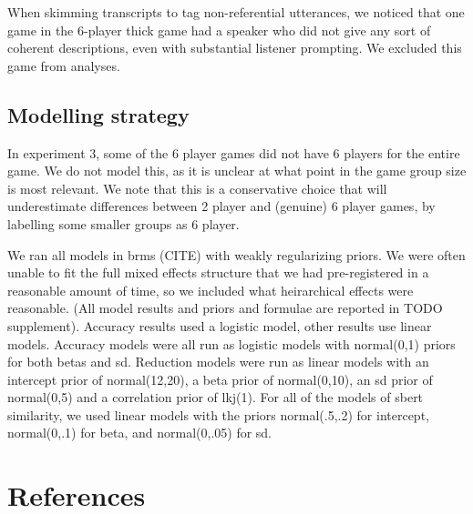 \documentclass[
  english,
  a4paper,
]{article}
\begin{document}
When skimming transcripts to tag non-referential utterances, we noticed that one game in the 6-player thick game had a speaker who did not give any sort of coherent descriptions, even with substantial listener prompting. We excluded this game from analyses.

\hypertarget{modelling-strategy}{%
\subsection{Modelling strategy}\label{modelling-strategy}}

In experiment 3, some of the 6 player games did not have 6 players for the entire game. We do not model this, as it is unclear at what point in the game group size is most relevant. We note that this is a conservative choice that will underestimate differences between 2 player and (genuine) 6 player games, by labelling some smaller groups as 6 player.

We ran all models in brms (CITE) with weakly regularizing priors. We were often unable to fit the full mixed effects structure that we had pre-registered in a reasonable amount of time, so we included what heirarchical effects were reasonable. (All model results and priors and formulae are reported in TODO supplement). Accuracy results used a logistic model, other results use linear models. Accuracy models were all run as logistic models with normal(0,1) priors for both betas and sd. Reduction models were run as linear models with an intercept prior of normal(12,20), a beta prior of normal(0,10), an sd prior of normal(0,5) and a correlation prior of lkj(1). For all of the models of sbert similarity, we used linear models with the priors normal(.5,.2) for intercept, normal(0,.1) for beta, and normal(0,.05) for sd.

\hypertarget{references}{%
\section{References}\label{references}}

\setlength{\parindent}{-0.1in} 
\setlength{\leftskip}{0.125in}

\noindent
\end{document}
